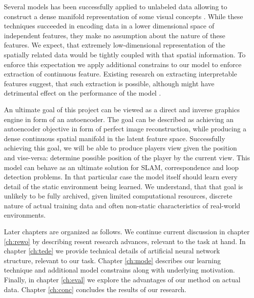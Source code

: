 Several models has been successfully applied to unlabeled data allowing to construct a dense manifold representation of some visual concepts \cite{Li2015, Kingma2013, Goodfellow2014}.
While these techniques succeeded in encoding data in a lower dimensional space of independent features, they make no assumption about the nature of these features.
We expect, that extremely low-dimensional representation of the spatially related data  would be tightly coupled with that spatial information.
To enforce this expectation we apply additional constrains to our model to enforce extraction of continuous feature.
Existing research on extracting interpretable features suggest, that such extraction is possible, although might have detrimental effect on the performance of the model \cite{Lei2016, Kulkarni2015}.

An ultimate goal of this project can be viewed as a direct and inverse graphics engine in form of an autoencoder.
The goal can be described as achieving an autoencoder objective in form of perfect image reconstruction, while producing a dense continuous spatial manifold in the latent feature space.
Successfully achieving this goal, we will be able to produce players view given the position and vise-versa: determine possible position of the player by the current view.
This model can behave as an ultimate solution for SLAM, correspondence and loop detection problems.
In that particular case the model itself should learn every detail of the static environment being learned.
We understand, that that goal is unlikely to be fully archived, given limited computational resources, discrete nature of actual training data and often non-static characteristics of real-world environments.

Later chapters are organized as follows.
We continue current discussion in chapter \ref{ch:rewo} by describing resent research advances, relevant to the task at hand.
In chapter \ref{ch:tede} we provide technical details of artificial neural network structure, relevant to our task.
Chapter \ref{ch:mode} describes our learning technique and additional model constrains along with underlying motivation.
Finally, in chapter \ref{ch:eval} we explore the advantages of our method on actual data.
Chapter \ref{ch:conc} concludes the results of our research.
